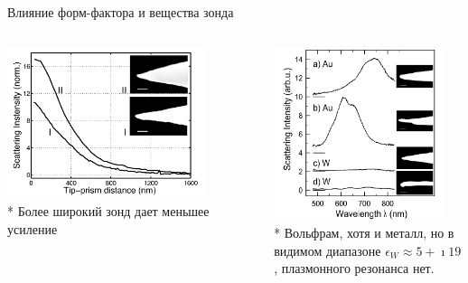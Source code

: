 \documentclass[9pt, compress, xcolor=table]{beamer}
\begin{document}
\begin{frame}{Влияние форм-фактора и вещества зонда }
\begin{columns}[c]
\column{6.5cm}
\begin{center}
\includegraphics[width=0.8\textwidth]{optant_18}
\\* Более широкий зонд дает меньшее усиление
\end{center}

\column{6.5cm}
\begin{center}
\includegraphics[width=0.9\textwidth]{optant_19}
\\* Вольфрам, хотя и металл, но в видимом диапазоне $\epsilon_W\approx5+\imath 19$, плазмонного резонанса нет.
\end{center}
\end{columns}

\end{frame}
\end{document}

